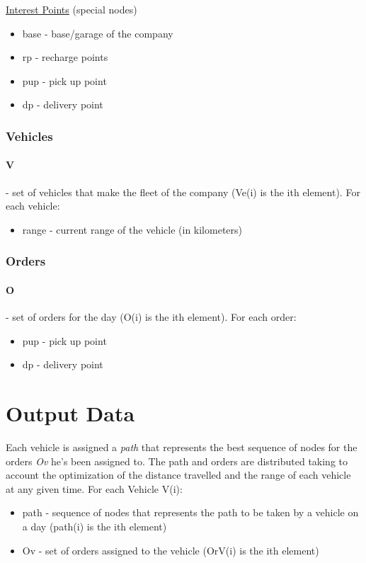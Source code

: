 \uline{Interest Points} (special nodes)
\begin{itemize}
	\item base - base/garage of the company
	\item rp - recharge points
	\item pup - pick up point
	\item dp - delivery point
\end{itemize}


\subsubsection{Vehicles}
\paragraph{V} - set of vehicles that make the fleet of the company (Ve(i) is the ith element). For each vehicle:
\begin{itemize}
	\item range - current range of the vehicle (in kilometers)
\end{itemize}

\subsubsection{Orders}
\paragraph{O} - set of orders for the day (O(i) is the ith element). For each order:
\begin{itemize}
    \item pup - pick up point
	\item dp - delivery point
\end{itemize}



\section{Output Data}
Each vehicle is assigned a \textit{path} that represents the best sequence of nodes for the orders \textit{Ov} he's been assigned to. The path and orders are distributed taking to account the optimization of the distance travelled and the range of each vehicle at any given time.
For each Vehicle V(i):
\begin{itemize}
	\item path - sequence of nodes that represents the path to be taken by a vehicle on a day (path(i) is the ith element)
	\item Ov - set of orders assigned to the vehicle (OrV(i) is the ith element)
\end{itemize}



